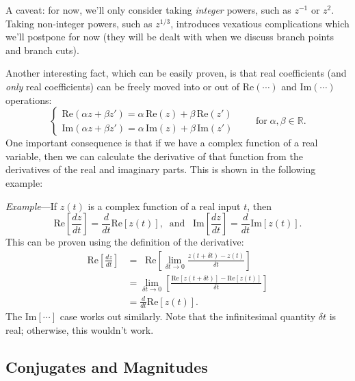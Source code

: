 \documentclass[10pt,a4paper]{article}
\begin{document}
A caveat: for now, we'll only consider taking \emph{integer} powers,
such as $z^{-1}$ or $z^2$. Taking non-integer powers, such as
$z^{1/3}$, introduces vexatious complications which we'll postpone for
now (they will be dealt with when we discuss branch points and branch
cuts).

Another interesting fact, which can be easily proven, is that real
coefficients (and \emph{only} real coefficients) can be freely moved
into or out of $\textrm{Re}(\cdots)$ and $\textrm{Im}(\cdots)$
operations:
\begin{equation}
\left\{\begin{array}{l}\mathrm{Re}(\alpha z + \beta z') = \alpha \, \mathrm{Re}(z) + \beta\, \mathrm{Re}(z')\\ \mathrm{Im}(\alpha z + \beta z') = \alpha \, \mathrm{Im}(z) + \beta\, \mathrm{Im}(z')\end{array}\right.\qquad\mathrm{for}\;\alpha, \beta \in \mathbb{R}.
\end{equation}
One important consequence is that if we have a complex function of a
real variable, then we can calculate the derivative of that function
from the derivatives of the real and imaginary parts. This is shown in
the following example:

\begin{framed} \noindent
  \textit{Example}---If $z(t)$ is a complex function of a real input $t$, then
  \begin{equation}
    \mathrm{Re}\left[\frac{dz}{dt}\right] = \frac{d}{dt} \mathrm{Re}\left[z(t)\right], \;\;\textrm{and}\;\;\; \mathrm{Im}\left[\frac{dz}{dt}\right] = \frac{d}{dt} \mathrm{Im}\left[z(t)\right].
  \end{equation}
This can be proven using the definition of the derivative:
\begin{align*}
  \mathrm{Re}\left[\frac{dz}{dt}\right] &= \;\; \mathrm{Re}\left[\lim_{\delta t \rightarrow 0} \frac{z(t+\delta t) - z(t)}{\delta t}\right] \\&= \lim_{\delta t \rightarrow 0} \left[\frac{\mathrm{Re}[z(t+\delta t)] - \mathrm{Re}[z(t)]}{\delta t}\right] \\&= \frac{d}{dt} \mathrm{Re}\left[z(t)\right].
\end{align*}
The $\mathrm{Im}[\cdots]$ case works out similarly. Note that the
infinitesimal quantity $\delta t$ is real; otherwise, this wouldn't
work.
\end{framed}

\subsection{Conjugates and Magnitudes}
\label{conjugates-and-magnitudes}
\end{document}
